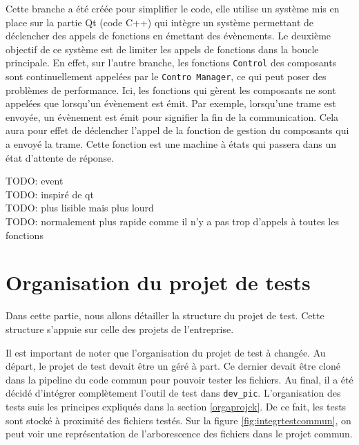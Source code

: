 \documentclass[a4paper]{article}
\begin{document}
Cette branche a été créée pour simplifier le code, elle utilise un système mis
en place sur la partie Qt (code C++) qui intègre un système permettant de
déclencher des appels de fonctions en émettant des évènements. Le deuxième
objectif de ce système est de limiter les appels de fonctions dans la boucle
principale. En effet, sur l'autre branche, les fonctions \verb|Control| des
composants sont continuellement appelées par le \verb|Contro Manager|, ce qui
peut poser des problèmes de performance. Ici, les fonctions qui gèrent les
composants ne sont appelées que lorsqu'un évènement est émit. Par exemple,
lorsqu'une trame est envoyée, un évènement est émit pour signifier la fin de la
communication. Cela aura pour effet de déclencher l'appel de la fonction de
gestion du composants qui a envoyé la trame. Cette fonction est une machine à
états qui passera dans un état d'attente de réponse.

TODO: event\\
TODO: inspiré de qt\\
TODO: plus lisible mais plus lourd\\
TODO: normalement plus rapide comme il n'y a pas trop d'appels à toutes les
fonctions

\section{Organisation du projet de tests}%

Dans cette partie, nous allons détailler la structure du projet de test. Cette
structure s'appuie sur celle des projets de l'entreprise.

Il est important de noter que l'organisation du projet de test à changée. Au
départ, le projet de test devait être un géré à part. Ce dernier devait être
cloné dans la pipeline du code commun pour pouvoir tester les fichiers. Au
final, il a été décidé d'intégrer complètement l'outil de test dans
\verb|dev_pic|. L'organisation des tests suis les principes expliqués dans la
section \ref{orgaprojck}. De ce fait, les tests sont stocké à proximité des
fichiers testés. Sur la figure \ref{fig:integrtestcommun}, on peut voir une
représentation de l'arborescence des fichiers dans le projet commun.

\end{document}

